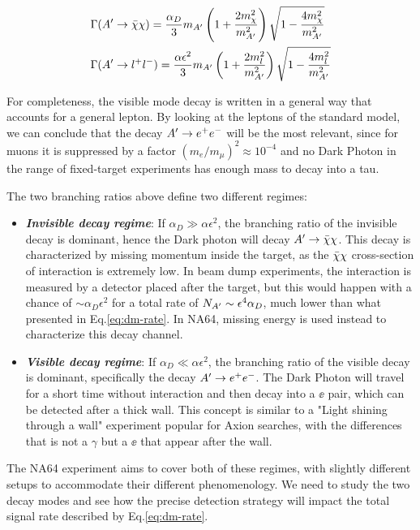 \begin{equation}
  \label{eq:dm-bratio}
  \begin{aligned}
    &\Gamma(A' \to \bar{\chi} \chi) = \frac{\alpha_D}{3} m_{A'} \left( 1 + \frac{2m^2_{\chi}}{m_{A'}^2}\right) \sqrt{1 - \frac{4m_{\chi}^2}{m^2_{A'}}}\\
    &\Gamma(A' \to l^+l^-) = \frac{\alpha \epsilon^2}{3} m_{A'} \left( 1 + \frac{2m^2_{l}}{m_{A'}^2}\right) \sqrt{1 - \frac{4m_{l}^2}{m^2_{A'}}}
  \end{aligned}
\end{equation}

For completeness, the visible mode decay is written in a general way that accounts for a general lepton. By looking at the leptons of the standard model, we can conclude that the decay $A' \to e^+e^-$ will be the most relevant, since for muons it is suppressed by a factor $(m_e/m_{\mu})^2 \approx 10^{-4}$ and no Dark Photon in the range of fixed-target experiments has enough mass to decay into a tau.

The two branching ratios above define two different regimes:
\begin{itemize}
\item \textbf{\textit{Invisible decay regime}}: If $\alpha_D \gg \alpha \epsilon^2$, the branching ratio of the invisible decay is dominant, hence the Dark photon will decay $A' \to \bar{\chi} \chi$. This decay is characterized by missing momentum inside the target, as the $\bar{\chi} \chi$ cross-section of interaction is extremely low. In beam dump experiments, the interaction is measured by a detector placed after the target, but this would happen with a chance of $\sim \alpha_D \epsilon^2$ for a total rate of $N_{A'} \sim \epsilon^4 \alpha_D$, much lower than what presented in Eq.\ref{eq:dm-rate}. In NA64, missing energy is used instead to characterize this decay channel. 
\item \textbf{\textit{Visible decay regime}}: If $\alpha_D \ll \alpha \epsilon^2$, the branching ratio of the visible decay is dominant, specifically the decay $A' \to e^+e^-$. The Dark Photon will travel for a short time without interaction and then decay into a $\ee$ pair, which can be detected after a thick wall. This concept is similar to a "Light shining through a wall" experiment popular for Axion searches, with the differences that is not a $\gamma$ but a $\ee$ that appear after the wall.
\end{itemize}

The NA64 experiment aims to cover both of these regimes, with slightly different setups to accommodate their different phenomenology. We need to study the two decay modes and see how the precise detection strategy will impact the total signal rate described by Eq.\ref{eq:dm-rate}.

